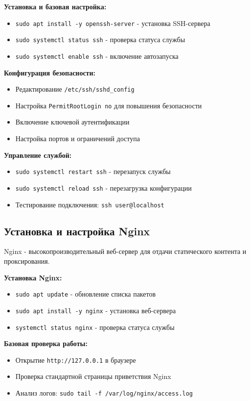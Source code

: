 \textbf{Установка и базовая настройка:}
\begin{itemize}
    \item \texttt{sudo apt install -y openssh-server} - установка SSH-сервера
    \item \texttt{sudo systemctl status ssh} - проверка статуса службы
    \item \texttt{sudo systemctl enable ssh} - включение автозапуска
\end{itemize}

\textbf{Конфигурация безопасности:}
\begin{itemize}
    \item Редактирование \verb|/etc/ssh/sshd_config|
    \item Настройка \texttt{PermitRootLogin no} для повышения безопасности
    \item Включение ключевой аутентификации
    \item Настройка портов и ограничений доступа
\end{itemize}

\textbf{Управление службой:}
\begin{itemize}
    \item \texttt{sudo systemctl restart ssh} - перезапуск службы
    \item \texttt{sudo systemctl reload ssh} - перезагрузка конфигурации
    \item Тестирование подключения: \texttt{ssh user@localhost}
\end{itemize}

\subsection{Установка и настройка Nginx}
Nginx - высокопроизводительный веб-сервер для отдачи статического контента и проксирования.

\textbf{Установка Nginx:}
\begin{itemize}
    \item \texttt{sudo apt update} - обновление списка пакетов
    \item \texttt{sudo apt install -y nginx} - установка веб-сервера
    \item \texttt{systemctl status nginx} - проверка статуса службы
\end{itemize}

\textbf{Базовая проверка работы:}
\begin{itemize}
    \item Открытие \texttt{http://127.0.0.1} в браузере
    \item Проверка стандартной страницы приветствия Nginx
    \item Анализ логов: \texttt{sudo tail -f /var/log/nginx/access.log}
\end{itemize}

